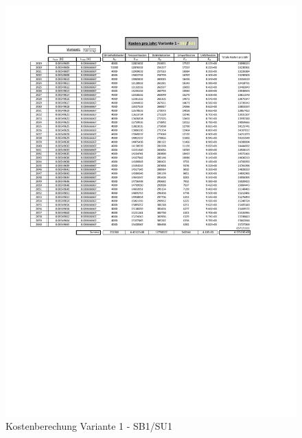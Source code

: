%
%
%
%


\begin{figure}[h!]
	\centering
	\includegraphics[width=\textwidth]{figures/Anhang/f-00-A-V1-B1-U1}
	\caption{Kostenberechung Variante 1 - SB1/SU1}
\end{figure}

